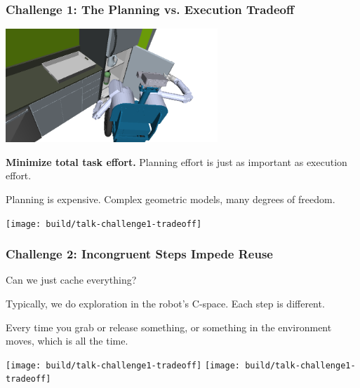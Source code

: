 \documentclass[serif]{beamer}
\begin{document}
%   
%   
%   
%      
%
%   
%   
%   
%   

\begin{frame}
   \frametitle{Challenge 1: The Planning vs. Execution Tradeoff}

   \begin{center}
      \includegraphics[width=0.6\textwidth]{figs/fridge-intro.png}
   \end{center}

   {\bf Minimize total task effort.}
   Planning effort is just as important as execution effort.
   
   \medskip

   Planning is expensive.
   Complex geometric models, many degrees of freedom.

   \medskip
   
   \texttt{[image: build/talk-challenge1-tradeoff]}
   
\end{frame}

\begin{frame}
   \frametitle{Challenge 2: Incongruent Steps Impede Reuse}

   Can we just cache everything?
   
   Typically, we do exploration in the robot's C-space.
   Each step is different.

   Every time you grab or release something,
   or something in the environment moves,
   which is all the time.
   
   \medskip
   \texttt{[image: build/talk-challenge1-tradeoff]}
   \texttt{[image: build/talk-challenge1-tradeoff]}
   
\end{frame}
\end{document}
